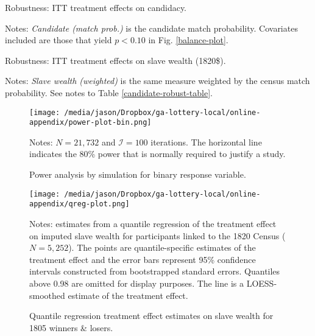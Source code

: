 \begin{table}[htbp] 
	\begin{center}
		\caption{Robustness: ITT treatment effects on candidacy.}   \label{candidate-robust-table}
		\resizebox{0.8\width}{!}{}
	\end{center}
	\footnotesize{Notes: \textit{Candidate (match prob.)} is the candidate match probability. Covariates included are those that yield $p <0.10$ in Fig. \ref{balance-plot}.}  
\end{table}  

\begin{table}[htbp] 
	\begin{center}
		\caption{Robustness: ITT treatment effects on slave wealth (1820\$).}   \label{slave-robust-table}
		\resizebox{0.8\width}{!}{}
	\end{center}
	\footnotesize{Notes: \textit{Slave wealth (weighted)} is the same measure weighted by the census match probability. See notes to Table \ref{candidate-robust-table}.}  
\end{table}   

\begin{figure}[htbp] %
	\begin{center}
		\caption{Power analysis by simulation for binary response variable.\label{power-plot-bin}}		
		\texttt{[image: /media/jason/Dropbox/ga-lottery-local/online-appendix/power-plot-bin.png]} 
	\end{center}
	\footnotesize{Notes: $N=21,732$ and $\mathcal{I} =100$ iterations. The horizontal line indicates the 80\% power that is normally required to justify a study.}
\end{figure}

\begin{figure}[htbp] %
	\begin{center}
		\caption{Quantile regression treatment effect estimates on slave wealth for 1805 winners \& losers. \label{qreg-plot} }
		\texttt{[image: /media/jason/Dropbox/ga-lottery-local/online-appendix/qreg-plot.png]} \\
	\end{center}
	\footnotesize{Notes: estimates from a quantile regression of the treatment effect on imputed slave wealth for participants linked to the 1820 Census ($N=5,252$). The points are quantile-specific estimates of the treatment effect and the error bars represent 95\% confidence intervals constructed from bootstrapped standard errors. Quantiles above 0.98 are omitted for display purposes. The line is a LOESS-smoothed estimate of the treatment effect.}
\end{figure}
